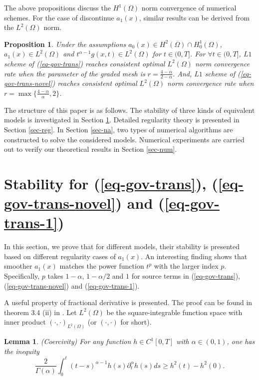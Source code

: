 \documentclass[11pt]{article}
\newtheorem{proposition}{Proposition}
\newtheorem{lemma}{Lemma}[section]
\numberwithin{equation}{section}
\begin{document}
The above propositions discuss the $H^1(\Omega)$ norm convergence of numerical schemes.
For the case of discontinue $a_1(x)$, similar results can be derived from the $L^2(\Omega)$ norm.
\begin{proposition}\label{main-pro3}
Under the assumptions $a_0(x)\in H^2(\Omega)\cap H_0^1(\Omega)$, $a_1(x)\in L^2(\Omega)$ and $t^{\alpha-1}g(x,t)\in L^2(\Omega)$ for $t\in(0,T]$.
For $\forall t\in(0,T]$, $L1$ scheme of (\ref{eq-gov-trans}) reaches consistent optimal $L^2(\Omega)$ norm convergence rate when the parameter of the graded mesh is $r=\frac{4-\alpha}{2-\alpha}$. And, $L1$ scheme of (\ref{eq-gov-trans-novel}) reaches consistent optimal $L^2(\Omega)$ norm convergence rate when $r=\max\{\frac{4-\alpha}{\alpha},2\}$.
\end{proposition}


The structure of this paper is as follows. The stability of three kinds of equivalent models is investigated in Section \ref{sec-stability}. Detailed regularity theory is presented in Section \ref{sec-reg}. In Section \ref{sec-na}, two types of numerical algorithms are constructed to solve the considered models. Numerical experiments are carried out to verify our theoretical results in Section \ref{sec-num}.


\section{Stability for (\ref{eq-gov-trans}), (\ref{eq-gov-trans-novel}) and (\ref{eq-gov-trans-1})}\label{sec-stability}
In this section, we prove that for different models, their stability is presented based on different regularity cases of $a_1(x)$. An interesting finding shows that smoother $a_1(x)$ matches the power function $t^p$ with the larger index $p$. 
Specifically, $p$ takes $1-\alpha$, $1-\alpha/2$ and $1$ for source terms in (\ref{eq-gov-trans}), (\ref{eq-gov-trans-novel}) and (\ref{eq-gov-trans-1}).

A useful property of fractional derivative is presented. The proof can be found in theorem 3.4 (ii) in \cite{Kubica}. Let $L^2(\Omega)$ be the square-integrable function space with inner product $(\cdot,\cdot)_{L^2(\Omega)}$ (or $(\cdot,\cdot)$ for short). 
\begin{lemma}\label{Coercivity}(Coercivity) For any function $h\in C^1[0,T]$ with $\alpha\in(0,1)$, one has the inequity 
    $$\frac{2}{\Gamma{(\alpha)}}\int_0^t(t-s)^{\alpha-1}h(s)\partial_t^\alpha h(s)ds\geq h^2(t)-h^2(0).$$
\end{lemma}
\end{document}
